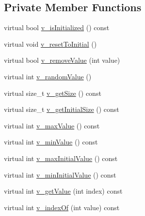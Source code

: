 \subsection*{Private Member Functions}
\begin{DoxyCompactItemize}
\item 
virtual bool \hyperlink{classghost_1_1Domain_a646bf5f075136019f7293a2eb579961c}{v\-\_\-is\-Initialized} () const 
\item 
virtual void \hyperlink{classghost_1_1Domain_a0f89336bd9e896cfd1a2370e046ff306}{v\-\_\-reset\-To\-Initial} ()
\item 
virtual bool \hyperlink{classghost_1_1Domain_a7eb3a5a063d0ef5f3d9a34ea94c60ca2}{v\-\_\-remove\-Value} (int value)
\item 
virtual int \hyperlink{classghost_1_1Domain_a754e6fb46c257e3afca5526f1f53726a}{v\-\_\-random\-Value} ()
\item 
virtual size\-\_\-t \hyperlink{classghost_1_1Domain_ada08a724a7f7577b28827d8dc59f266c}{v\-\_\-get\-Size} () const 
\item 
virtual size\-\_\-t \hyperlink{classghost_1_1Domain_a4a6d7cb6ad3bc2da4bdcd0b4c6fdb5c5}{v\-\_\-get\-Initial\-Size} () const 
\item 
virtual int \hyperlink{classghost_1_1Domain_a5d441a1d7089a3bc625ceb9d9c07a3ca}{v\-\_\-max\-Value} () const 
\item 
virtual int \hyperlink{classghost_1_1Domain_ac95854fb6558052c5f4a3a7d41969765}{v\-\_\-min\-Value} () const 
\item 
virtual int \hyperlink{classghost_1_1Domain_a395d5db933ee17ddba2e6ba33d839863}{v\-\_\-max\-Initial\-Value} () const 
\item 
virtual int \hyperlink{classghost_1_1Domain_a13fca53c9bab9f73ebf027eee0fbc319}{v\-\_\-min\-Initial\-Value} () const 
\item 
virtual int \hyperlink{classghost_1_1Domain_a72fa6a9c0634bfa70ea03c8508b098a6}{v\-\_\-get\-Value} (int index) const 
\item 
virtual int \hyperlink{classghost_1_1Domain_aa11386635cf4100b36c92a64eb613ddb}{v\-\_\-index\-Of} (int value) const 
\end{DoxyCompactItemize}
